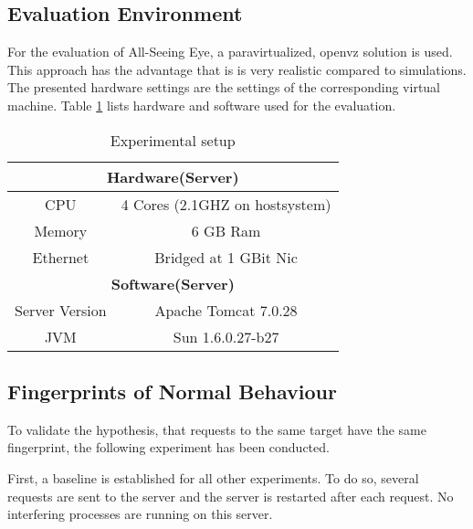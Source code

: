 \documentclass[conference]{IEEEtran}
\begin{document}
\subsection{Evaluation Environment}
For the evaluation of All-Seeing Eye, a paravirtualized, openvz solution \cite{openvz_2013}  is used. 
This approach has the advantage that is is very realistic compared to simulations. 
The presented hardware settings are the settings of the corresponding virtual machine. 
Table \ref{tab:metcond} lists hardware and software used for the evaluation.

\begin{table}[htpb]
\centering
\caption{Experimental setup}\label{tab:metcond}
    \begin{tabular}{|c|c|}  
\hline
	\hline
\multicolumn{2}{|c|}{\textbf{Hardware(Server)}}\\
\hline
CPU & 4 Cores (2.1GHZ on hostsystem)\\
Memory & 6 GB Ram\\
Ethernet & Bridged at 1 GBit Nic \\
\hline
\multicolumn{2}{|c|}{\textbf{Software(Server)}}\\
\hline
Server Version & Apache Tomcat 7.0.28 \cite{tomcat_2013}\\
JVM & Sun 1.6.0.27-b27\\
    \hline
    \end{tabular}
    
\end{table}


\subsection{Fingerprints of Normal Behaviour}
To validate the hypothesis, that requests to the same target have the same fingerprint, the following experiment has been conducted.

First, a baseline is established for all other experiments. To do so, several requests are sent to the server and the server is restarted after each request. No interfering processes are running on this server.
\end{document}
